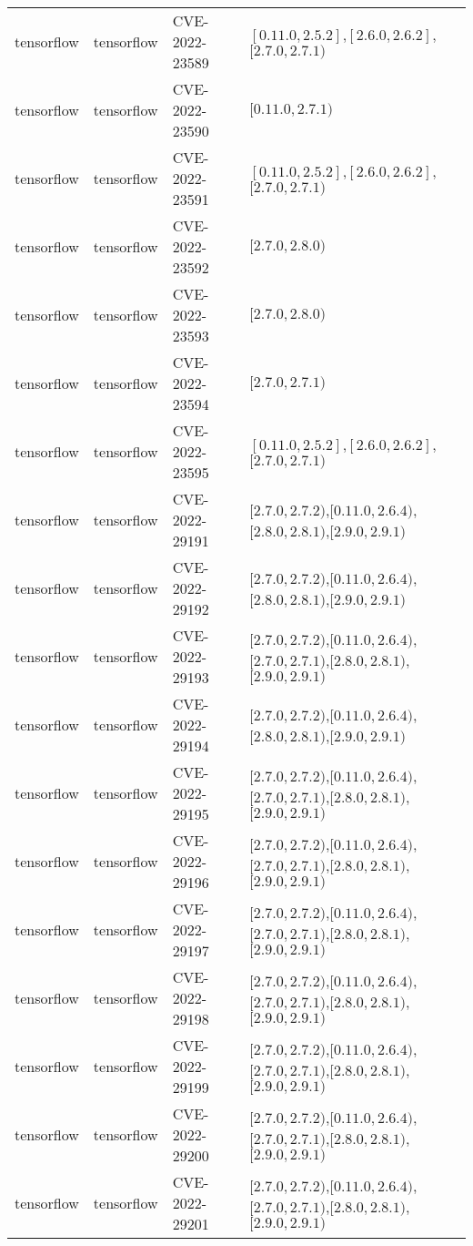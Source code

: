 \begin{tabular}{llll}
tensorflow & tensorflow & CVE-2022-23589 & $[0.11.0,2.5.2]$,$[2.6.0,2.6.2]$,$[2.7.0,2.7.1)$ \\
tensorflow & tensorflow & CVE-2022-23590 & $[0.11.0,2.7.1)$ \\
tensorflow & tensorflow & CVE-2022-23591 & $[0.11.0,2.5.2]$,$[2.6.0,2.6.2]$,$[2.7.0,2.7.1)$ \\
tensorflow & tensorflow & CVE-2022-23592 & $[2.7.0,2.8.0)$ \\
tensorflow & tensorflow & CVE-2022-23593 & $[2.7.0,2.8.0)$ \\
tensorflow & tensorflow & CVE-2022-23594 & $[2.7.0,2.7.1)$ \\
tensorflow & tensorflow & CVE-2022-23595 & $[0.11.0,2.5.2]$,$[2.6.0,2.6.2]$,$[2.7.0,2.7.1)$ \\
tensorflow & tensorflow & CVE-2022-29191 & $[2.7.0,2.7.2)$,$[0.11.0,2.6.4)$,$[2.8.0,2.8.1)$,$[2.9.0,2.9.1)$ \\
tensorflow & tensorflow & CVE-2022-29192 & $[2.7.0,2.7.2)$,$[0.11.0,2.6.4)$,$[2.8.0,2.8.1)$,$[2.9.0,2.9.1)$ \\
tensorflow & tensorflow & CVE-2022-29193 & $[2.7.0,2.7.2)$,$[0.11.0,2.6.4)$,$[2.7.0,2.7.1)$,$[2.8.0,2.8.1)$,$[2.9.0,2.9.1)$ \\
tensorflow & tensorflow & CVE-2022-29194 & $[2.7.0,2.7.2)$,$[0.11.0,2.6.4)$,$[2.8.0,2.8.1)$,$[2.9.0,2.9.1)$ \\
tensorflow & tensorflow & CVE-2022-29195 & $[2.7.0,2.7.2)$,$[0.11.0,2.6.4)$,$[2.7.0,2.7.1)$,$[2.8.0,2.8.1)$,$[2.9.0,2.9.1)$ \\
tensorflow & tensorflow & CVE-2022-29196 & $[2.7.0,2.7.2)$,$[0.11.0,2.6.4)$,$[2.7.0,2.7.1)$,$[2.8.0,2.8.1)$,$[2.9.0,2.9.1)$ \\
tensorflow & tensorflow & CVE-2022-29197 & $[2.7.0,2.7.2)$,$[0.11.0,2.6.4)$,$[2.7.0,2.7.1)$,$[2.8.0,2.8.1)$,$[2.9.0,2.9.1)$ \\
tensorflow & tensorflow & CVE-2022-29198 & $[2.7.0,2.7.2)$,$[0.11.0,2.6.4)$,$[2.7.0,2.7.1)$,$[2.8.0,2.8.1)$,$[2.9.0,2.9.1)$ \\
tensorflow & tensorflow & CVE-2022-29199 & $[2.7.0,2.7.2)$,$[0.11.0,2.6.4)$,$[2.7.0,2.7.1)$,$[2.8.0,2.8.1)$,$[2.9.0,2.9.1)$ \\
tensorflow & tensorflow & CVE-2022-29200 & $[2.7.0,2.7.2)$,$[0.11.0,2.6.4)$,$[2.7.0,2.7.1)$,$[2.8.0,2.8.1)$,$[2.9.0,2.9.1)$ \\
tensorflow & tensorflow & CVE-2022-29201 & $[2.7.0,2.7.2)$,$[0.11.0,2.6.4)$,$[2.7.0,2.7.1)$,$[2.8.0,2.8.1)$,$[2.9.0,2.9.1)$ \\

\end{tabular}
